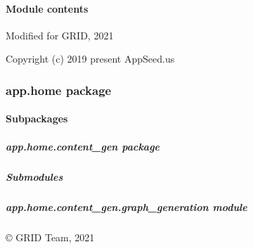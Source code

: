 \documentclass[letterpaper,10pt,french]{sphinxmanual}
\begin{document}
\paragraph{Module contents}
\label{\detokenize{app.base:module-app.base}}\label{\detokenize{app.base:module-contents}}
\sphinxAtStartPar
Modified for GRID, 2021

\sphinxAtStartPar
Copyright (c) 2019 \sphinxhyphen{} present AppSeed.us


\subsubsection{app.home package}
\label{\detokenize{app.home:app-home-package}}\label{\detokenize{app.home::doc}}

\paragraph{Subpackages}
\label{\detokenize{app.home:subpackages}}

\subparagraph{app.home.content\_gen package}
\label{\detokenize{app.home.content_gen:app-home-content-gen-package}}\label{\detokenize{app.home.content_gen::doc}}

\subparagraph{Submodules}
\label{\detokenize{app.home.content_gen:submodules}}

\subparagraph{app.home.content\_gen.graph\_generation module}
\label{\detokenize{app.home.content_gen:module-app.home.content_gen.graph_generation}}\label{\detokenize{app.home.content_gen:app-home-content-gen-graph-generation-module}}
\sphinxAtStartPar
© GRID Team, 2021
\end{document}
